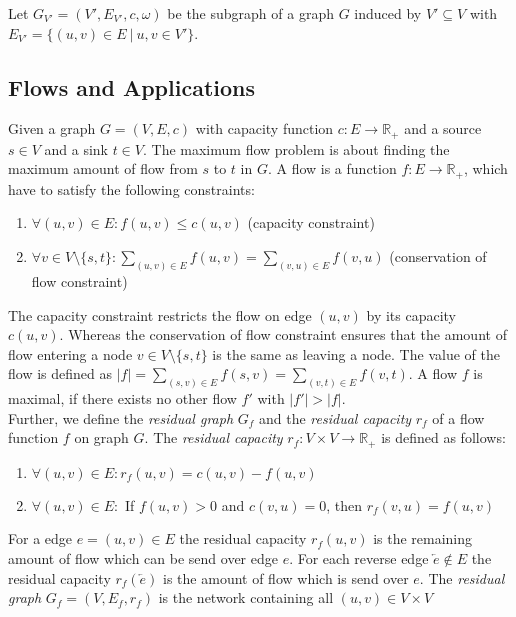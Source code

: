 \begin{definition}
Let $G_{V'} = (V',E_{V'},c,\omega)$ be the subgraph of a graph $G$
induced by $V' \subseteq V$ with $E_{V'} = \{(u,v) \in E\ |\ u,v \in V'\}$.
\label{def:subgraph}
\end{definition}


\subsection{Flows and Applications}
\label{sec:applications}

Given a graph $G = (V,E,c)$ with capacity function $c: E \rightarrow \mathbb{R}_+$ and a source 
$s \in V$ and a sink $t \in V$. The maximum flow problem is about finding 
the maximum amount of flow from $s$ to $t$ in $G$. A flow is a function 
$f: E \rightarrow \mathbb{R}_+$, which have to satisfy the following constraints:
\begin{enumerate}
\item $\forall (u,v) \in E: f(u,v) \le c(u,v)$ (capacity constraint)
\item $\forall v \in V \setminus \{s,t\}: \sum_{(u,v) \in E} f(u,v) = \sum_{(v,u) \in E} f(v,u)$ (conservation of flow constraint)
\end{enumerate}
The capacity constraint restricts the flow on edge $(u,v)$ by its capacity 
$c(u,v)$. Whereas the conservation of flow constraint ensures that the amount
of flow entering a node $v \in V \setminus \{s,t\}$ is the same as leaving a node.
The value of the flow is defined as $|f| = \sum_{(s,v) \in E} f(s,v) = \sum_{(v,t) \in E} f(v,t)$.
A flow $f$ is maximal, if there exists no other flow $f'$ with $|f'| > |f|$. \\
Further, we define the \emph{residual graph} $G_f$ and the 
\emph{residual capacity} $r_f$ of a flow function $f$ on graph $G$.
The \emph{residual capacity} $r_f: V \times V \rightarrow \mathbb{R}_+$ is defined as follows:
\begin{enumerate}
\item $\forall (u,v) \in E: r_f(u,v) = c(u,v) - f(u,v)$
\item $\forall (u,v) \in E:$ If $f(u,v) > 0$ and $c(v,u) = 0$, then $r_f(v,u) = f(u,v)$
\end{enumerate}
For a edge $e = (u,v) \in E$ the residual capacity $r_f(u,v)$ is the remaining amount of 
flow which can be send over edge $e$. For each reverse edge $\overleftarrow{e} \notin E$ the
residual capacity $r_f(\overleftarrow{e})$ is the amount of flow which is send over $e$.
The \emph{residual graph} $G_f = (V,E_f,r_f)$ is the network containing all $(u,v) \in V \times V$
